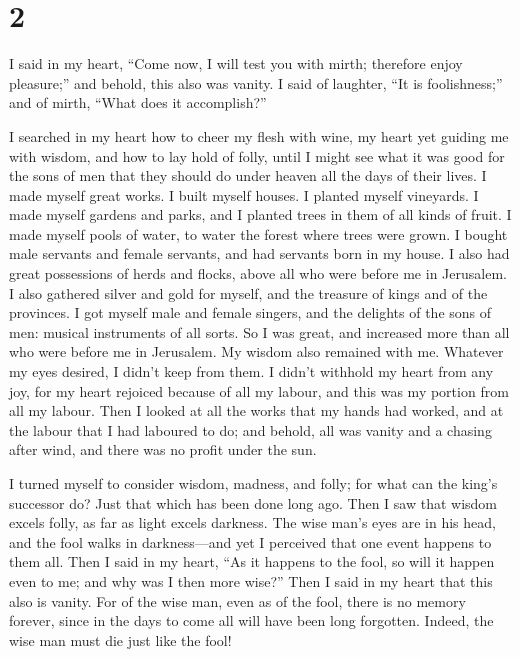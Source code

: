 \hypertarget{section-1}{%
\section{2}\label{section-1}}

 I said in my heart, ``Come now, I will test you with mirth;
therefore enjoy pleasure;'' and behold, this also was vanity.
 I said of laughter, ``It is foolishness;'' and of mirth,
``What does it accomplish?''

 I searched in my heart how to cheer my flesh with wine, my
heart yet guiding me with wisdom, and how to lay hold of folly, until I
might see what it was good for the sons of men that they should do under
heaven all the days of their lives.  I made myself great
works. I built myself houses. I planted myself vineyards.  I
made myself gardens and parks, and I planted trees in them of all kinds
of fruit.  I made myself pools of water, to water the forest
where trees were grown.  I bought male servants and female
servants, and had servants born in my house. I also had great
possessions of herds and flocks, above all who were before me in
Jerusalem.  I also gathered silver and gold for myself, and
the treasure of kings and of the provinces. I got myself male and female
singers, and the delights of the sons of men: musical instruments of all
sorts.  So I was great, and increased more than all who were
before me in Jerusalem. My wisdom also remained with me. 
Whatever my eyes desired, I didn't keep from them. I didn't withhold my
heart from any joy, for my heart rejoiced because of all my labour, and
this was my portion from all my labour.  Then I looked at
all the works that my hands had worked, and at the labour that I had
laboured to do; and behold, all was vanity and a chasing after wind, and
there was no profit under the sun.

 I turned myself to consider wisdom, madness, and folly;
for what can the king's successor do? Just that which has been done long
ago.  Then I saw that wisdom excels folly, as far as light
excels darkness.  The wise man's eyes are in his head, and
the fool walks in darkness---and yet I perceived that one event happens
to them all.  Then I said in my heart, ``As it happens to
the fool, so will it happen even to me; and why was I then more wise?''
Then I said in my heart that this also is vanity.  For of
the wise man, even as of the fool, there is no memory forever, since in
the days to come all will have been long forgotten. Indeed, the wise man
must die just like the fool!

